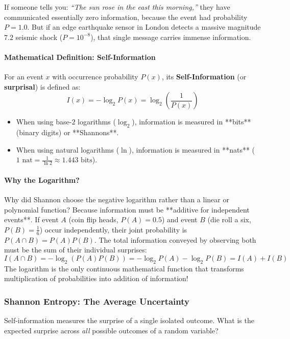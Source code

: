 If someone tells you: \textit{``The sun rose in the east this morning,''} they have communicated essentially zero information, because the event had probability $P = 1.0$. But if an edge earthquake sensor in London detects a massive magnitude $7.2$ seismic shock ($P = 10^{-8}$), that single message carries immense information.

\paragraph{Mathematical Definition: Self-Information}
For an event $x$ with occurrence probability $P(x)$, its \textbf{Self-Information} (or \textbf{surprisal}) is defined as:
\begin{equation}
I(x) = -\log_2 P(x) = \log_2 \left(\frac{1}{P(x)}\right)\label{eq:self_information}
\end{equation}
\begin{itemize}
    \item When using base-$2$ logarithms ($\log_2$), information is measured in **bits** (binary digits) or **Shannons**.
    \item When using natural logarithms ($\ln$), information is measured in **nats** ($1\text{ nat} = \frac{1}{\ln 2} \approx 1.443\text{ bits}$).
\end{itemize}

\paragraph{Why the Logarithm?}
Why did Shannon choose the negative logarithm rather than a linear or polynomial function? 
Because information must be **additive for independent events**. If event $A$ (coin flip heads, $P(A) = 0.5$) and event $B$ (die roll a six, $P(B) = \frac{1}{6}$) occur independently, their joint probability is $P(A \cap B) = P(A)P(B)$. The total information conveyed by observing both must be the sum of their individual surprises:
\begin{equation}
I(A \cap B) = -\log_2(P(A)P(B)) = -\log_2 P(A) - \log_2 P(B) = I(A) + I(B)
\end{equation}
The logarithm is the only continuous mathematical function that transforms multiplication of probabilities into addition of information!

\subsubsection{Shannon Entropy: The Average Uncertainty}
Self-information measures the surprise of a single isolated outcome. What is the expected surprise across \textit{all} possible outcomes of a random variable?

